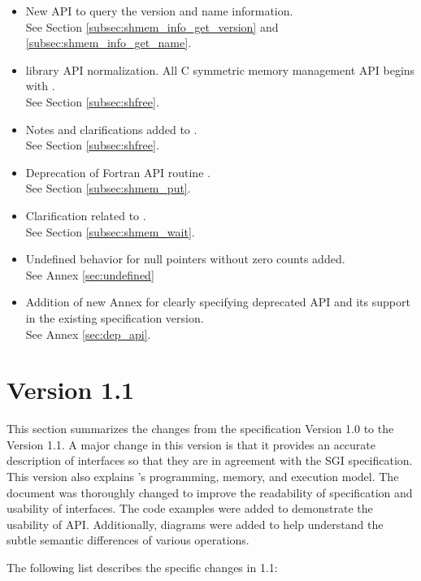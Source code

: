 \begin{itemize}
%
\item New API to query the version and name information. 
\\See Section \ref{subsec:shmem_info_get_version} and \ref{subsec:shmem_info_get_name}.
%
\item \openshmem library API normalization. All C symmetric memory management
      API begins with  .
\\See Section \ref{subsec:shfree}.
%
\item Notes and clarifications added to .
\\See Section \ref{subsec:shfree}.
%
\item Deprecation of Fortran API routine .
\\See Section \ref{subsec:shmem_put}. 
%
\item Clarification related to .
\\See Section \ref{subsec:shmem_wait}.
%
\item Undefined behavior for null pointers without zero counts added.
\\See Annex \ref{sec:undefined}
%
\item Addition of new Annex for clearly specifying deprecated API and its
      support in the existing specification version.
\\See Annex \ref{sec:dep_api}.
%
\end{itemize}




\section{Version 1.1}
This section summarizes the changes from the \openshmem specification Version
1.0 to the Version 1.1.  A major change in this version is that it provides an
accurate description of \openshmem interfaces so that they are in agreement with
the SGI specification.  This version also explains \openshmem’s programming,
memory, and execution model.  The document was thoroughly changed to improve the
readability of specification and usability of interfaces.  The code examples
were added to demonstrate the usability of API. Additionally, diagrams were
added to help understand the subtle semantic differences of various operations.


The following list describes the specific changes in 1.1:

